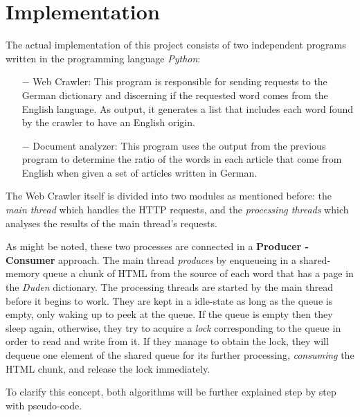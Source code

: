 \documentclass{article}
\begin{document}
\section{Implementation}
The actual implementation of this project consists of two independent programs written in the programming language \textit{Python}:
\begin{itemize}
	\item[$-$] Web Crawler: This program is responsible for sending requests to the German dictionary and discerning if the requested word comes from the English language. As output, it generates a list that includes each word found by the crawler to have an English origin.
	\item[$-$] Document analyzer: This program uses the output from the previous program to determine the ratio of the words in each article that come from English when given a set of articles written in German.
\end{itemize}

The Web Crawler itself is divided into two modules as mentioned before: the \textit{main thread} which handles the HTTP requests, and the \textit{processing threads} which analyses the results of the main thread's requests.


As might be noted, these two processes are connected in a \textbf{Producer - Consumer} approach. The main thread \textit{produces} by enqueueing in a shared-memory queue a chunk of HTML from the source of each word that has a page in the \textit{Duden} dictionary. The processing threads are started by the main thread before it begins to work. They are kept in a idle-state as long as the queue is empty, only waking up to peek at the queue. If the queue is empty then they sleep again, otherwise, they try to acquire a \textit{lock} corresponding to the queue in order to read and write from it. If they manage to obtain the lock, they will dequeue one element of the shared queue for its further processing, \textit{consuming} the HTML chunk, and release the lock immediately.

To clarify this concept, both algorithms will be further explained step by step with pseudo-code.
\end{document}
